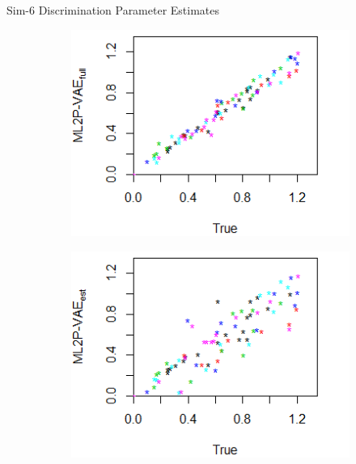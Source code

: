 \documentclass{beamer}
\theoremstyle{definition}
\begin{document}
\begin{frame}{Sim-6 Discrimination Parameter Estimates}
\begin{figure}[h]
\centering
    \begin{subfigure}{.32\textwidth}
      \centering
      \includegraphics[width=.9\linewidth]{../img/ml_journal_results/6skills/vae_full_disc_6skills.png}
    \end{subfigure}
    \begin{subfigure}{.32\textwidth}
      \centering
      \includegraphics[width=.9\linewidth]{../img/ml_journal_results/6skills/vae_est_disc_6skills.png}
    \end{subfigure}
    \begin{subfigure}{.32\textwidth}
      \centering

\end{subfigure}
\end{figure}
\end{frame}
\end{document}

